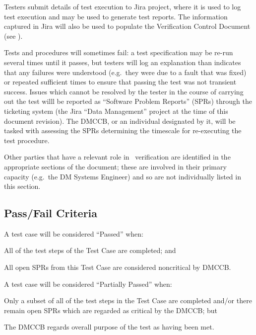 Testers submit details of test execution to Jira project, where it is used to log test execution and may be used to generate test reports.
The information captured in Jira will also be used to populate the Verification Control Document (see ).

Tests and procedures will sometimes fail: a test specification may be re-run several times until it passes, but testers will log an explanation than indicates that any failures were understood (e.g.\ they were due to a fault that was fixed) or repeated sufficient times to ensure that passing the test was not transient success.
Issues which cannot be resolved by the tester in the course of carrying out the test willl be reported as ``Software Problem Reports'' (SPRs) through the \product{} ticketing system (the Jira ``Data Management'' project at the time of this document revision).
The DMCCB, or an individual designated by it, will be tasked with assessing the SPRs determining the timescale for re-executing the test procedure.

Other parties that have a relevant role in \product\ verification are identified in the appropriate sections of the document; these are involved in their primary capacity (e.g.\ the DM Systems Engineer) and so are not individually listed in this section.

\subsection{Pass/Fail Criteria}

A test case will be considered ``Passed'' when:

\begin{itemize_single}
\item{All of the test steps of the Test Case are completed; and}
\item{All open SPRs from this Test Case are considered noncritical by DMCCB.}
\end{itemize_single}

A test case will be considered ``Partially Passed'' when:

\begin{itemize_single}
\item{Only a subset of all of the test steps in the Test Case are completed and/or there remain open SPRs which are regarded as critical by the DMCCB; but}
\item{The DMCCB regards overall purpose of the test as having been met.}
\end{itemize_single}

